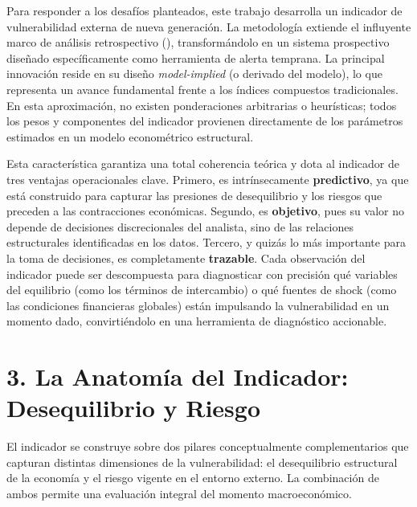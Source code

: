 \documentclass[11pt,a4paper]{article}
\begin{document}
Para responder a los desafíos planteados, este trabajo desarrolla un indicador de vulnerabilidad externa de nueva generación. La metodología extiende el influyente marco de análisis retrospectivo (\cite{izquierdo2008booms}), transformándolo en un sistema prospectivo diseñado específicamente como herramienta de alerta temprana. La principal innovación reside en su diseño \emph{model-implied} (o derivado del modelo), lo que representa un avance fundamental frente a los índices compuestos tradicionales. En esta aproximación, no existen ponderaciones arbitrarias o heurísticas; todos los pesos y componentes del indicador provienen directamente de los parámetros estimados en un modelo econométrico estructural.

Esta característica garantiza una total coherencia teórica y dota al indicador de tres ventajas operacionales clave. Primero, es intrínsecamente \textbf{predictivo}, ya que está construido para capturar las presiones de desequilibrio y los riesgos que preceden a las contracciones económicas. Segundo, es \textbf{objetivo}, pues su valor no depende de decisiones discrecionales del analista, sino de las relaciones estructurales identificadas en los datos. Tercero, y quizás lo más importante para la toma de decisiones, es completamente \textbf{trazable}. Cada observación del indicador puede ser descompuesta para diagnosticar con precisión qué variables del equilibrio (como los términos de intercambio) o qué fuentes de shock (como las condiciones financieras globales) están impulsando la vulnerabilidad en un momento dado, convirtiéndolo en una herramienta de diagnóstico accionable.


\section*{3. La Anatomía del Indicador: Desequilibrio y Riesgo}

El indicador se construye sobre dos pilares conceptualmente complementarios que capturan distintas dimensiones de la vulnerabilidad: el desequilibrio estructural de la economía y el riesgo vigente en el entorno externo. La combinación de ambos permite una evaluación integral del momento macroeconómico.
\end{document}
